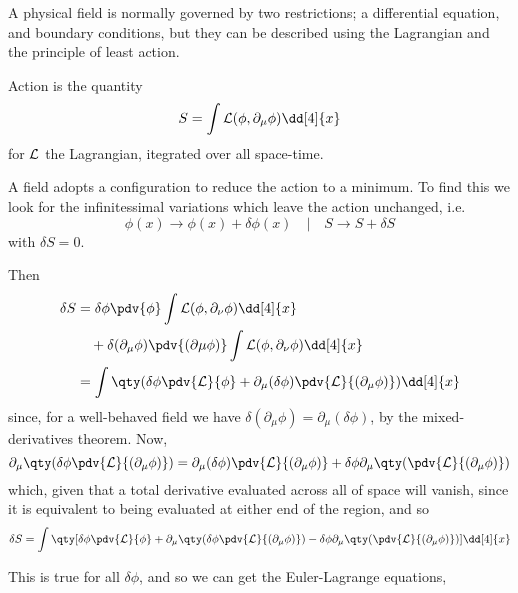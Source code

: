 
A physical field is normally governed by two restrictions; a
differential equation, and boundary conditions, but they can be
described using the Lagrangian and the principle of least action.

\begin{definition}[Action]
  Action is the quantity
  \[ S = \int \Lag(\phi, \partial_\mu \phi) \dd[4]{x} \]
  for $\mathcal{L}$ the Lagrangian, itegrated over all space-time.
\end{definition}

A field adopts a configuration to reduce the action to a minimum. To
find this we look for the infinitessimal variations which leave the
action unchanged, i.e.
\begin{equation}
  \label{eq:1}
  \phi(x) \to \phi(x) + \delta \phi(x) \quad | \quad S \to S + \delta S 
\end{equation}
with $\delta S = 0$.

Then
\begin{align*}
  \delta S &= 
     \delta \phi \pdv{\phi} \int \Lag(\phi, \partial_{\nu} \phi) \dd[4]{x} \\ 
     &\quad+ \delta(\partial_{\mu} \phi ) \pdv{(\partial \mu
        \phi)} \int \Lag(\phi, \partial_{\nu} \phi) \dd[4]{x} \\
     &= \int \qty( \delta \phi \pdv{\Lag}{\phi} + \partial_{\mu} (\delta
        \phi) \pdv{\Lag}{(\partial_{\mu} \phi)} ) \dd[4]{x}
\end{align*}
since, for a well-behaved field we have $\delta (\partial_{\mu} \phi)
= \partial_{\mu}(\delta \phi)$, by the mixed-derivatives theorem.
Now, 
\begin{equation}
  \label{eq:2}
  \partial_{\mu} \qty( \delta \phi \pdv{\Lag}{(\partial_{\mu} \phi)} ) = 
  \partial_{\mu} (\delta \phi) \pdv{\Lag}{(\partial_{\mu} \phi)} + \delta \phi \partial_{\mu} \qty( \pdv{\Lag}{(\partial_{\mu} \phi)} )
\end{equation}
which, given that a total derivative evaluated across all of space
will vanish, since it is equivalent to being evaluated at either end
of the region, and so
\begin{equation}
  \label{eq:3}
  \delta S = \int \qty[ \delta \phi \pdv{\Lag}{\phi} + \partial_{\mu} \qty(\delta \phi \pdv{\Lag}{(\partial_{\mu} \phi)}) - \delta \phi \partial_{\mu} \qty( \pdv{\Lag}{(\partial_{\mu}\phi)})] \dd[4]{x}
\end{equation}

This is true for all $\delta \phi$, and so we can get the
Euler-Lagrange equations,

